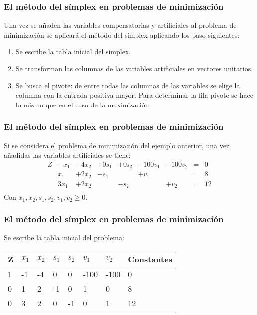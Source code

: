 \documentclass{beamer}
\begin{document}
\begin{frame}
\frametitle{El m\'etodo del s\'implex en problemas de minimizaci\'on}
Una vez se a\~naden las variables compensatorias y artificiales al problema de minimizaci\'on se aplicar\'a el m\'etodo del s\'implex aplicando los paso siguientes:
\begin{enumerate}
\item Se escribe la tabla inicial del s\'implex.
\item Se transforman las columnas de las variables artificiales en vectores unitarios.
\item Se busca el pivote: de entre todas las columnas de las variables se elige la columna con la entrada positiva mayor. Para determinar la fila pivote se hace lo mismo que en el caso de la maximizaci\'on.
\end{enumerate}
\end{frame}


\begin{frame}
\frametitle{El m\'etodo del s\'implex en problemas de minimizaci\'on}
Si se considera el problema de minimizaci\'on del ejemplo anterior, una vez a\~nadidas las variables artificiales se tiene:
\[\left.\begin{array}{rrrrrrrrr}
Z & -x_1 & -4x_2 & +0s_1 & +0s_2& -100v_1 & -100 v_2 & = & 0 \\
 &  x_1 & +2x_2 & -s_1 & &  +v_1&& = & 8 \\
 & 3x_1 & +2x_2 &  & -s_2&  & +v_2 & = & 12 \\
  \end{array}\right.\]
Con $x_1,x_2,s_1,s_2,v_1,v_2\geq 0$.
\end{frame}

\begin{frame}
\frametitle{El m\'etodo del s\'implex en problemas de minimizaci\'on}
Se escribe la tabla inicial del problema:
\begin{tabular}{ |p{1cm}||p{0.8cm}|p{0.8cm}|p{0.8cm}|p{0.8cm}|p{0.8cm}|p{0.8cm}|p{1.6cm}|  }
 \hline
 Z & $x_1$ & $x_2$ & $s_1$& $s_2$ & $v_1$  & $v_2$& Constantes \\
 \hline
1 &-1 & -4 & 0 & 0& -100& -100 & 0 \\
0 & 1 &  2 & -1 & 0 & 1 & 0 & 8 \\
0 & 3 & 2 & 0 & -1 & 0 & 1  & 12 \\
 \hline
\end{tabular}
\end{frame}
\end{document}
